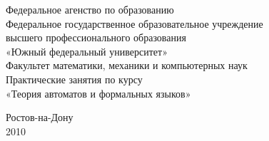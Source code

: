 \documentclass[12pt]{article}%
\newcommand{\ListCount}{8}
\newcommand{\Lnum}{0}
\newcommand{\InsertList}[1]{%

}
\theoremstyle{remark}
\theoremstyle{definition}
\begin{document}
{\Large\sffamily
\thispagestyle{empty}
\begin{center}
Федеральное агенство по образованию\\
\vspace*{0.4cm}
Федеральное государственное образовательное учреждение \\
высшего профессионального образования\\
«Южный федеральный университет»\\
\vspace*{0.4cm}
Факультет математики, механики и компьютерных наук\\
\vspace*{150pt}
Практические занятия по курсу\\
«Теория автоматов и формальных языков»\\
\end{center}
\vspace{3cm}

\vfill
\begin{center} 
Ростов-на-Дону\\
2010
\end{center}
}
\pagebreak

\setcounter{page}{2}

\forloop{i}{1}{\value{i} < \ListCount}{%
    \renewcommand{\Lnum}{\thei}
    \InsertList{\thei}
    \pagebreak
}
\end{document}
